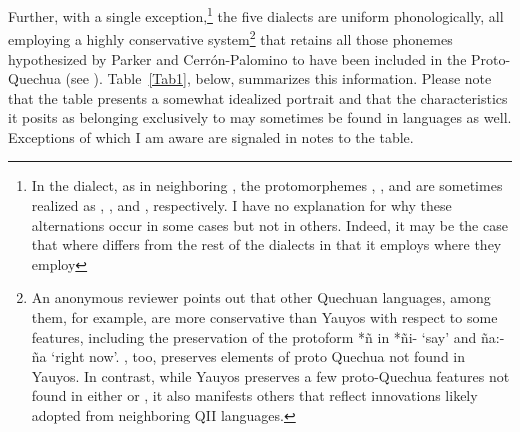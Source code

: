 \largerpage
Further, with a single exception,\footnote{In the \CH{} dialect, as in neighboring , the protomorphemes , , and  are sometimes realized as \textipa{[l]}, \textipa{[h]}, and \textipa{[sh]}, respectively. I have no explanation for why these alternations occur in some cases but not in others. Indeed, it may be the case that where \CH{} differs from the rest of the dialects in that it employs where they employ } the five dialects are uniform phonologically, all employing a highly conservative system\footnote{An anonymous reviewer points out that other Quechuan languages,  among them, for example, are more conservative than Yauyos with respect to some features, including the preservation of the protoform *ñ in *ñi- ‘say’ and ña:-ña ‘right now’. , too, preserves elements of proto Quechua not found in Yauyos. In contrast, while Yauyos preserves a few proto-Quechua features not found in either  or , it also manifests others that reflect innovations likely adopted from neighboring QII languages.} that retains all those phonemes hypothesized by Parker and Cerrón-Palomino to have been included in the Proto-Quechua (see ). Table~\ref{Tab1}, below, summarizes this information. Please note that the table presents a somewhat idealized portrait and that the characteristics it posits as belonging exclusively to \QII{} may sometimes be found in \QI{} languages as well. Exceptions of which I am aware are signaled in notes to the table.

